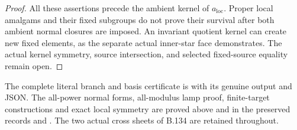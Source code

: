 \begin{proof}
All these assertions precede the ambient kernel of
$a_{\mathrm{loc}}$. Proper local amalgams and their fixed
subgroups do not prove their survival after both ambient
normal closures are imposed. An invariant quotient kernel can
create new fixed elements, as the separate actual inner-star
face demonstrates. The actual kernel symmetry, source
intersection, and selected fixed-source equality remain open.
\end{proof}

\begingroup\raggedright\footnotesize
The complete literal branch and basis certificate is
with its genuine output and JSON. The all-power normal forms,
all-modulus lamp proof, finite-target constructions and exact
local symmetry are proved above and in the preserved records
and
.
The two actual cross sheets of B.134 are retained throughout.
\par\endgroup
